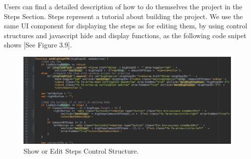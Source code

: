 Users can find a detailed description of how to do themselves the project in the Steps Section. Steps represent a tutorial about building the project. We use the same UI component for displaying the steps as for editing them, by using control structures and javascript hide and display functions, as the following code snipet shows [See Figure 3.9]. 

\begin{figure}
\includegraphics[width=1\linewidth]{images/stepsEdit&Present.png}
\caption{Show or Edit Steps Control Structure.}
\label{fig:edit_present_steps.}
\end{figure}	

 












